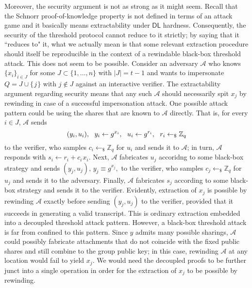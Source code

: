 \documentclass[10pt, psamsfonts, reqno]{amsart}
\theoremstyle{definition}
\theoremstyle{remark}
\numberwithin{equation}{section}
\begin{document}
Moreover, the security argument is not as strong
as it might seem. Recall that the Schnorr proof-of-knowledge
property is not defined in terms of an attack game
and it basically means extractability under $\mathsf{DL}$
hardness. Consequently, the security of the threshold protocol
cannot reduce to it strictly;
by saying that it ``reduces to" it,
what we actually mean is that
some relevant extraction procedure
should itself be reproducible in the context of
a rewindable black-box threshold attack.
This does not seem to be possible.
Consider an adversary $\mathcal{A}$ who knows
$\{x_i\}_{i \in J}$
for some $J \subset \{1, \dots, n\}$ with $|J| = t - 1$
and wants to impersonate
$Q = J \cup \{\hspace{1pt}j\hspace{1pt}\}$
with $j \not \in J$ against an interactive verifier.
The extractability argument regarding security
means that any such $\mathcal{A}$
should necessarily spit $x_j$ by rewinding in case of
a successful impersonation attack.
One possible attack pattern could
be using the shares that are known to $\mathcal{A}$ directly.
That is, for every $i \in J$,
$\mathcal{A}$ sends
\vspace{5pt}
\begin{equation*}
(y_i, u_i),
\ \ y_i \leftarrow g ^ {x_i},
\ \ u_i \leftarrow g ^ {r_i},
\ \ r_i \leftarrow_\$ \mathbb{Z}_q
\vspace{5pt}
\end{equation*}
to the verifier,
who samples $c_i \leftarrow_\$ \mathbb{Z}_q$
for $u_i$
and sends it to $\mathcal{A}$;
in turn, $\mathcal{A}$ responds
with $s_i \leftarrow r_i + c_i\hspace{1pt}x_i$.
Next, $\mathcal{A}$ fabricates $u_j$
accoridng to some black-box strategy and sends
$(y_j, u_j),\hspace{2pt} y_j \equiv g ^ {x_j},$ to the verifier,
who samples $c_j \leftarrow_\$ \mathbb{Z}_q$ for $u_j$
and sends it to the adversary.
Finally, $\mathcal{A}$ fabricates $s_j$
according to some black-box strategy
and sends it to the verifier.
Evidently, extraction of $x_j$ is possible
by rewinding $\mathcal{A}$
exactly before sending $(y_j, u_j)$ to the verifier,
provided that it
succeeds in generating a valid transcript.
This is ordinary extraction
embedded into a decoupled threshold attack pattern.
However, a black-box threshold attack
is far from confined to this pattern.
Since $y$ admits many possible sharings,
$\mathcal{A}$ could possibly fabricate attachments
that do not coincide with the fixed public shares
and still combine to the group public key;
in this case, rewinding $\mathcal{A}$ at any location
would fail to yield $x_j$.
We would need the decoupled proofs to
be further junct into a single operation
in order for the extraction of $x_j$
to be possible by rewinding.
\end{document}

